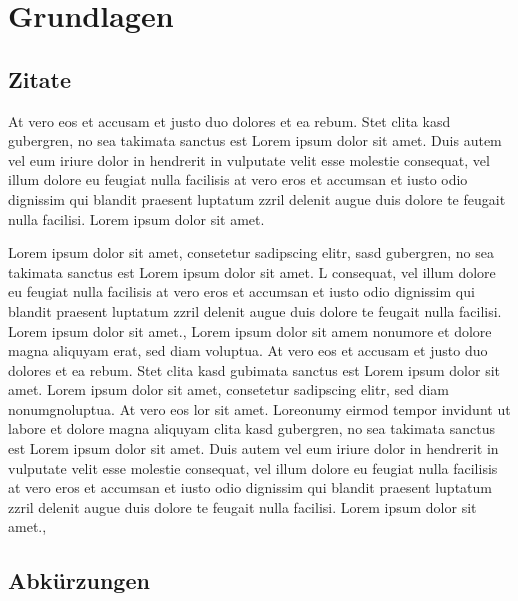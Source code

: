 \section{Grundlagen}

\subsection{Zitate}

At vero eos et accusam et justo duo dolores et ea rebum. Stet clita kasd gubergren, no sea takimata sanctus est Lorem ipsum dolor sit amet. Duis autem vel eum iriure dolor in hendrerit in vulputate velit esse molestie consequat, vel illum dolore eu feugiat nulla facilisis at vero eros et accumsan et iusto odio dignissim qui blandit praesent luptatum zzril delenit augue duis dolore te feugait nulla facilisi. Lorem ipsum dolor sit amet.

Lorem ipsum dolor sit amet, consetetur sadipscing elitr, sasd gubergren, no sea takimata sanctus est Lorem ipsum dolor sit amet. L consequat, vel illum dolore eu feugiat nulla facilisis at vero eros et accumsan et iusto odio dignissim qui blandit praesent luptatum zzril delenit augue duis dolore te feugait nulla facilisi. Lorem ipsum dolor sit amet.\cite{maschek2013zugbeeinflussung}, \cite{wende2013fahrdynamik} Lorem ipsum dolor sit amem nonumore et dolore magna aliquyam erat, sed diam voluptua. At vero eos et accusam et justo duo dolores et ea rebum. Stet clita kasd gubimata sanctus est Lorem ipsum dolor sit amet. Lorem ipsum dolor sit amet, consetetur sadipscing elitr, sed diam nonumgnoluptua. At vero eos lor sit amet. Loreonumy eirmod tempor invidunt ut labore et dolore magna aliquyam clita kasd gubergren, no sea takimata sanctus est Lorem ipsum dolor sit amet. Duis autem vel eum iriure dolor in hendrerit in vulputate velit esse molestie consequat, vel illum dolore eu feugiat nulla facilisis at vero eros et accumsan et iusto odio dignissim qui blandit praesent luptatum zzril delenit augue duis dolore te feugait nulla facilisi. Lorem ipsum dolor sit amet.\cite{maschek2013zugbeeinflussung}, \cite{wende2013fahrdynamik}

\subsection{Abkürzungen}

